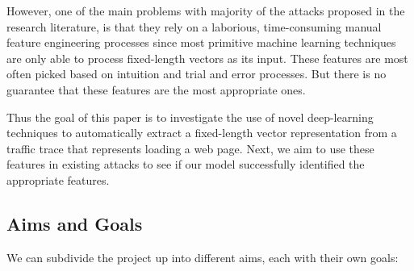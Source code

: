 However, one of the main problems with majority of the attacks proposed in the research literature, is that they rely on a laborious,
time-consuming manual feature engineering processes since most primitive machine learning techniques are only able to
process fixed-length vectors as its input. These features are most often picked based on intuition and trial and error processes.
But there is no guarantee that these features are the most appropriate ones.

Thus the goal of this paper is to investigate the use of novel deep-learning techniques to automatically extract
a fixed-length vector representation from a traffic trace that represents loading a web page.
Next, we aim to use these features in existing attacks to see if our model successfully identified the appropriate features.

\newpage

\subsection{Aims and Goals}
We can subdivide the project up into different aims, each with their own goals:

